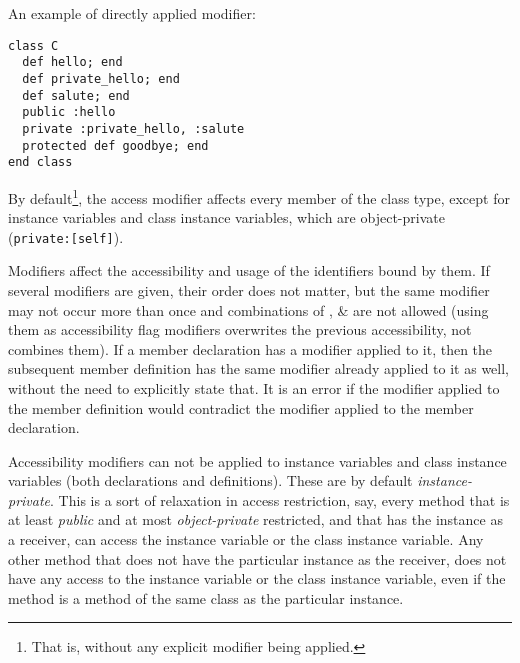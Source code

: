 \example An example of directly applied modifier:
\begin{lstlisting}
class C
  def hello; end
  def private_hello; end
  def salute; end
  public :hello
  private :private_hello, :salute
  protected def goodbye; end
end class
\end{lstlisting}

By default\footnote{That is, without any explicit modifier being applied.}, the  access modifier affects every member of the class type, except for instance variables and class instance variables, which are object-private (\lstinline!private:[self]!). 

Modifiers affect the accessibility and usage of the identifiers bound by them. If several modifiers are given, their order does not matter, but the same modifier may not occur more than once and combinations of ,  \&  are not allowed (using them as accessibility flag modifiers overwrites the previous accessibility, not combines them). If a member declaration has a modifier applied to it, then the subsequent member definition has the same modifier already applied to it as well, without the need to explicitly state that. It is an error if the modifier applied to the member definition would contradict the modifier applied to the member declaration. 

Accessibility modifiers can not be applied to instance variables and class instance variables (both declarations and definitions). These are by default {\em instance-private}. This is a sort of relaxation in access restriction, say, every method that is at least {\em public} and at most {\em object-private} restricted, and that has the instance as a receiver, can access the instance variable or the class instance variable. Any other method that does not have the particular instance as the receiver, does not have any access to the instance variable or the class instance variable, even if the method is a method of the same class as the particular instance. 

